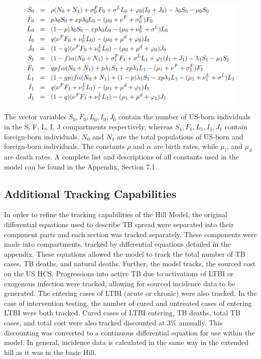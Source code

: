 \documentclass{amsart}
\begin{document}
\begin{figure}
\includegraphics[scale=0.75]{figures/BasicHillEquations.pdf}
\end{figure}

The vector variables $S_{0}, F_{0}, L_{0}, I_{0}, J_{0}$ contain the number of
US-born individuals in the S, F, L, I, J compartments respectively, whereas $S_{1},
F_{1}, L_{1}, I_{1}, J_{1}$ contain foreign-born individuals.  $N_{0}$ and
$N_{1}$ are the total populations of US-born and foreign-born individuals.
The constants $\rho$ and $\alpha$ are birth rates, while $\mu_{i}$, and $\mu_{d}$ are death rates.  
A complete list and descriptions of all constants used in the model can be found in the Appendix,
Section 7.1.

\subsection{Additional Tracking Capabilities}
In order to refine the tracking capabilities of the
Hill Model, the original differential equations used to describe TB spread were
separated into their component parts and each section was tracked separately.
These components were made into compartments, tracked by differential equations
detailed in the appendix. These equations allowed the model to track the total
number of TB cases, TB deaths, and  natural deaths. Further, the model tracks,
the sourced cost on the US HCS. Progressions into
active TB due to activations of LTBI or exogenous infection were tracked,
allowing for sourced incidence data to be generated. The entering cases of LTBI
(acute or chronic) were also tracked. In the case of intervention testing, the
number of cured and untreated cases of entering LTBI were both tracked. Cured
cases of LTBI entering, TB deaths, total TB cases, and total cost were also
tracked discounted at 3\% annually. This discounting was converted to a
continuous differential equation for use within the model. In general, incidence
data is calculated in the same way in the extended hill as it was in the basic
Hill.
\end{document}
